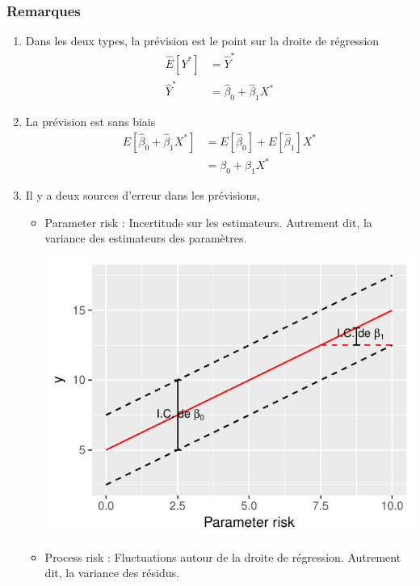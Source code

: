 \documentclass[11pt,french]{report}
\begin{document}
\subsubsection*{Remarques}
\begin{enumerate}
\item Dans les deux types, la prévision est le point sur la droite de régression
\begin{align*}
\widehat{E}[Y^*] &= \hat{Y}^* \\
\hat{Y}^* &= \hat{\beta}_0 +  \hat{\beta}_1X^*
\end{align*}
\item La prévision est sans biais 
\begin{align*}
E[\hat{\beta}_0 +  \hat{\beta}_1X^*] &= E[\hat{\beta}_0] + E[\hat{\beta}_1]X^* \\
&= \beta_0 +  \beta_1X^*
\end{align*}
\item Il y a deux sources d'erreur dans les prévisions,
\bigskip
\begin{itemize}
\item Parameter risk : Incertitude sur les estimateurs. Autrement dit, la variance des estimateurs des paramètres.

\includegraphics{notes_de_cours-017}

\bigskip
\item Process risk : Fluctuations autour de la droite de régression. Autrement dit, la variance des résidus.
\bigskip


\end{itemize}
\end{enumerate}
\end{document}
